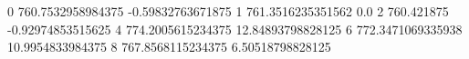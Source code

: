 0 760.7532958984375 -0.59832763671875
1 761.3516235351562 0.0
2 760.421875 -0.92974853515625
4 774.2005615234375 12.84893798828125
6 772.3471069335938 10.9954833984375
8 767.8568115234375 6.50518798828125
